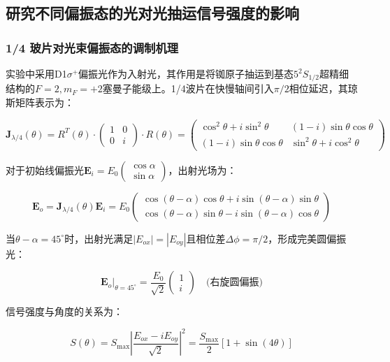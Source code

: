 \subsection{研究不同偏振态的光对光抽运信号强度的影响}


\subsubsection{1/4 玻片对光束偏振态的调制机理}
实验中采用D1$\sigma^+$偏振光作为入射光，其作用是将铷原子抽运到基态$5^2S_{1/2}$超精细结构的$F=2,m_F=+2$塞曼子能级上。1/4波片在快慢轴间引入$\pi/2$相位延迟，其琼斯矩阵表示为：

$$ \mathbf{J}_{\lambda/4}(\theta) = R^{T}(\theta)\cdot
\begin{pmatrix}
1 & 0 \\
0 & i 
\end{pmatrix}
\cdot R(\theta) = 
\begin{pmatrix}
\cos^2\theta + i\sin^2\theta & (1-i)\sin\theta\cos\theta \\
(1-i)\sin\theta\cos\theta & \sin^2\theta + i\cos^2\theta
\end{pmatrix} $$

对于初始线偏振光$\mathbf{E}_i = E_0\begin{pmatrix} \cos\alpha \\ \sin\alpha \end{pmatrix}$，出射光场为：

$$ \mathbf{E}_o = \mathbf{J}_{\lambda/4}(\theta)\mathbf{E}_i = E_0
\begin{pmatrix}
\cos(\theta-\alpha)\cos\theta + i\sin(\theta-\alpha)\sin\theta \\
\cos(\theta-\alpha)\sin\theta - i\sin(\theta-\alpha)\cos\theta
\end{pmatrix} $$

当$\theta-\alpha=45^\circ$时，出射光满足$|E_{ox}|=|E_{oy}|$且相位差$\Delta\phi=\pi/2$，形成完美圆偏振光：

$$ \mathbf{E}_o\big|_{\theta=45^\circ} = \frac{E_0}{\sqrt{2}}
\begin{pmatrix}
1 \\
i 
\end{pmatrix} \quad \text{(右旋圆偏振)} $$

信号强度与角度的关系为：

$$ S(\theta) = S_{\text{max}}\left|\frac{E_{ox}-iE_{oy}}{\sqrt{2}}\right|^2 = \frac{S_{\text{max}}}{2}[1+\sin(4\theta)] $$

